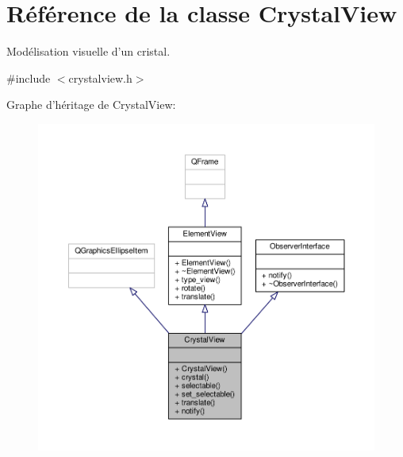 \hypertarget{classCrystalView}{\section{Référence de la classe Crystal\+View}
\label{classCrystalView}
}


Modélisation visuelle d’un cristal.  




{\ttfamily \#include $<$crystalview.\+h$>$}



Graphe d'héritage de Crystal\+View\+:
\nopagebreak
\begin{figure}[H]
\begin{center}
\leavevmode
\includegraphics[width=350pt]{d8/d3c/classCrystalView__inherit__graph}
\end{center}
\end{figure}


